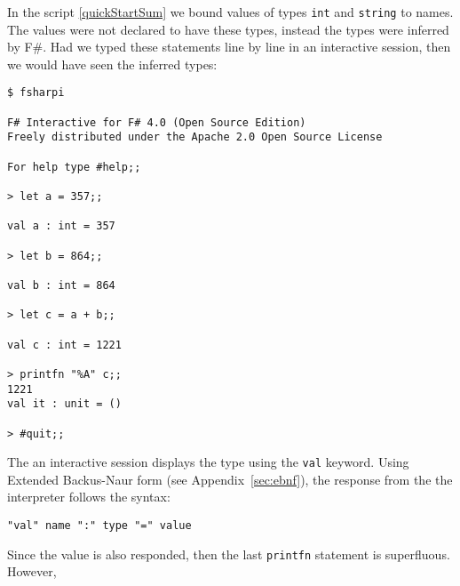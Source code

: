In the script \ref{quickStartSum} we bound values of types \lstinline|int| and \lstinline|string| to names. The values were not declared to have these types, instead the types were inferred by F\#. Had we typed these statements line by line in an interactive session, then we would have seen the inferred types:
\begin{lstlisting}[language=console]
$ fsharpi

F# Interactive for F# 4.0 (Open Source Edition)
Freely distributed under the Apache 2.0 Open Source License

For help type #help;;

> let a = 357;;         

val a : int = 357

> let b = 864;;

val b : int = 864

> let c = a + b;;

val c : int = 1221

> printfn "%A" c;;
1221
val it : unit = ()

> #quit;;
\end{lstlisting}
The an interactive session displays the type using the \lstinline|val| keyword. Using Extended Backus-Naur form (see Appendix~\ref{sec:ebnf}), the response from the the interpreter follows the syntax: 
\begin{lstlisting}[language=ebnf]
  "val" name ":" type "=" value
\end{lstlisting}
Since the value is also responded, then the last \lstinline|printfn| statement is superfluous. However, 

